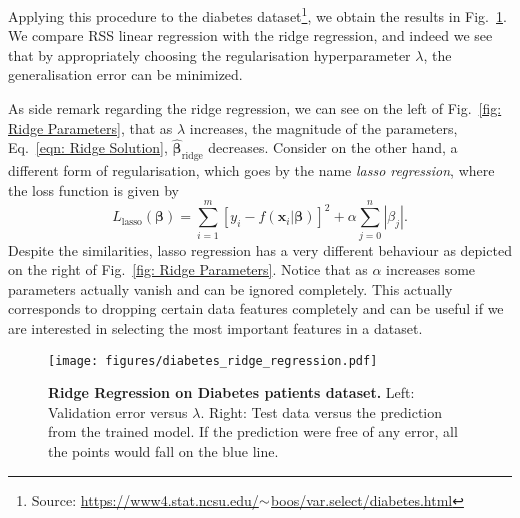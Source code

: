 Applying this procedure to the diabetes dataset\footnote{Source: \href{https://www4.stat.ncsu.edu/~boos/var.select/diabetes.html}{https://www4.stat.ncsu.edu/$\small{\sim}$boos/var.select/diabetes.html}}, we obtain the results in Fig.~\ref{fig: Regression on Diabetes Dataset}. We compare RSS linear regression with the ridge regression, and indeed we see that by appropriately choosing the regularisation hyperparameter $\lambda$, the generalisation error can be minimized.

As side remark regarding the ridge regression, we can see on the left of Fig.~\ref{fig: Ridge Parameters}, that as $\lambda$ increases, the magnitude of the parameters, Eq.~\eqref{eqn: Ridge Solution}, $\hat{\bm{\beta}}_{\textrm{ridge}}$ decreases. Consider on the other hand, a different form of regularisation, which goes by the name \emph{lasso regression}, where the loss function is given by
\begin{equation}\label{eqn: Lasso}
    L_{\textrm{lasso}}(\bm{\beta}) = \sum_{i=1}^{m} \left[y_{i} -  f(\boldsymbol{x}_i|\bm{\beta})\right]^{2} + \alpha \sum_{j=0}^{n} |\beta_{j}|.
\end{equation}
Despite the similarities, lasso regression has a very different behaviour as depicted on the right of Fig.~\ref{fig: Ridge Parameters}. Notice that as $\alpha$ increases some parameters actually vanish and can be ignored completely. This actually corresponds to dropping certain data features completely and can be useful if we are interested in selecting the most important features in a dataset. 

\begin{figure}[t]
\centering
    \texttt{[image: figures/diabetes\_ridge\_regression.pdf]}
    \caption{\textbf{Ridge Regression on Diabetes patients dataset.} Left: Validation error versus $\lambda$. Right: Test data versus the prediction from the trained model. If 
    the prediction were free of any error, all the points would fall on the blue line.
    }
\label{fig: Regression on Diabetes Dataset}
\end{figure}

